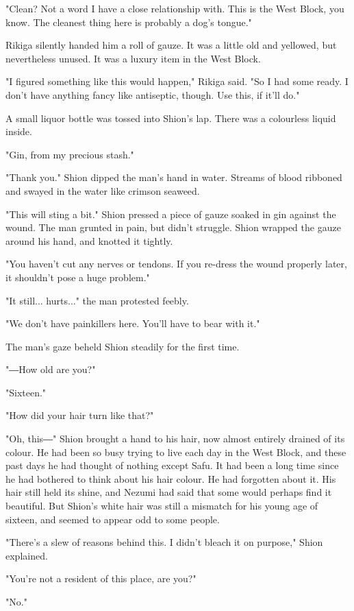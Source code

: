 "Clean? Not a word I have a close relationship with. This is the West
Block, you know. The cleanest thing here is probably a dog's tongue."

Rikiga silently handed him a roll of gauze. It was a little old and
yellowed, but nevertheless unused. It was a luxury item in the West
Block.

"I figured something like this would happen," Rikiga said. "So I had
some ready. I don't have anything fancy like antiseptic, though. Use
this, if it'll do."

A small liquor bottle was tossed into Shion's lap. There was a
colourless liquid inside.

"Gin, from my precious stash."

"Thank you." Shion dipped the man's hand in water. Streams of blood
ribboned and swayed in the water like crimson seaweed.

"This will sting a bit." Shion pressed a piece of gauze soaked in gin
against the wound. The man grunted in pain, but didn't struggle. Shion
wrapped the gauze around his hand, and knotted it tightly.

"You haven't cut any nerves or tendons. If you re-dress the wound
properly later, it shouldn't pose a huge problem."

"It still... hurts..." the man protested feebly.

"We don't have painkillers here. You'll have to bear with it."

The man's gaze beheld Shion steadily for the first time.

"―How old are you?"

"Sixteen."

"How did your hair turn like that?"

"Oh, this―" Shion brought a hand to his hair, now almost entirely
drained of its colour. He had been so busy trying to live each day in
the West Block, and these past days he had thought of nothing except
Safu. It had been a long time since he had bothered to think about his
hair colour. He had forgotten about it. His hair still held its shine,
and Nezumi had said that some would perhaps find it beautiful. But
Shion's white hair was still a mismatch for his young age of sixteen,
and seemed to appear odd to some people.

"There's a slew of reasons behind this. I didn't bleach it on purpose,"
Shion explained.

"You're not a resident of this place, are you?"

"No."

